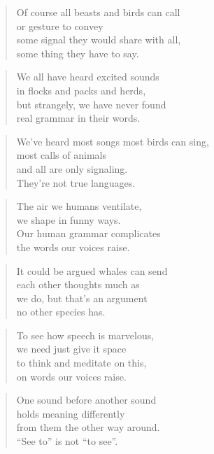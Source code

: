 \documentclass[14pt,a4paper]{article}
\begin{document}
\begin{verse}
Of course all beasts and birds can call\\
or gesture to convey\\
some signal they would share with all,\\
some thing they have to say.
\end{verse}

\begin{verse}
We all have heard excited sounds\\
in flocks and packs and herds,\\
but strangely, we have never found\\
real grammar in their words.
\end{verse}

\begin{verse}
We’ve heard most songs most birds can sing,\\
most calls of animals\\
and all are only signaling.\\
They’re not true languages.
\end{verse}

\begin{verse}
The air we humans ventilate,\\
we shape in funny ways.\\
Our human grammar complicates\\
the words our voices raise.
\end{verse}

\begin{verse}
It could be argued whales can send\\
each other thoughts much as\\
we do, but that’s an argument\\
no other species has.
\end{verse}

\begin{verse}
To see how speech is marvelous,\\
we need just give it space\\
to think and meditate on this,\\
on words our voices raise.
\end{verse}

\begin{verse}
One sound before another sound\\
holds meaning differently\\
from them the other way around.\\
“See to” is not “to see”.
\end{verse}
\end{document}
